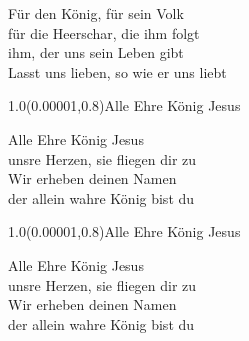 \documentclass[aspectratio=169]{beamer}
\begin{document}
\begin{frame}
\centering
\color{white}
\huge{Für den König, für sein Volk} \\
\huge{für die Heerschar, die ihm folgt} \\
\huge{ihm, der uns sein Leben gibt} \\
\huge{Lasst uns lieben, so wie er uns liebt} \\

\begin{textblock}{1.0}(0.00001,0.8)\color{gray}\normalsize{Alle Ehre König Jesus}\end{textblock}
\end{frame}

\begin{frame}
\centering
\color{white}
\huge{Alle Ehre König Jesus} \\
\huge{unsre Herzen, sie fliegen dir zu} \\
\huge{Wir erheben deinen Namen} \\
\huge{der allein wahre König bist du} \\

\begin{textblock}{1.0}(0.00001,0.8)\color{gray}\normalsize{Alle Ehre König Jesus}\end{textblock}
\end{frame}

\begin{frame}
\centering
\color{white}
\huge{Alle Ehre König Jesus} \\
\huge{unsre Herzen, sie fliegen dir zu} \\
\huge{Wir erheben deinen Namen} \\
\huge{der allein wahre König bist du} \\
\end{frame}
\end{document}
